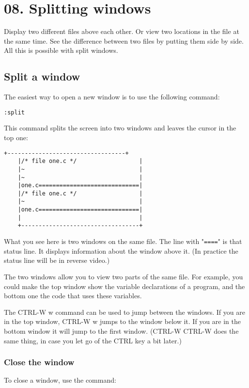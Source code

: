 \section{08. Splitting windows}
Display two different files above each other.
Or view two locations in the file at the same time.
See the difference between two files by putting them side by side.
All this is possible with split windows.
\subsection{Split a window}

The easiest way to open a new window is to use the following command:

 \begin{Verbatim}[samepage=true]
 :split
 \end{Verbatim}

This command splits the screen into two windows and leaves the cursor in the top one:

\begin{Verbatim}[samepage=true]
    +----------------------------------+
    |/* file one.c */                  |
    |~                                 |
    |~                                 |
    |one.c=============================|
    |/* file one.c */                  |
    |~                                 |
    |one.c=============================|
    |                                  |
    +----------------------------------+
\end{Verbatim}

What you see here is two windows on the same file.
The line with "\verb!====!" is that status line.
It displays information about the window above it.
(In practice the status line will be in reverse video.)

The two windows allow you to view two parts of the same file.
For example, you could make the top window show the variable declarations of a program, and the bottom one the code that uses these variables.

The CTRL-W w command can be used to jump between the windows.
If you are in the top window, CTRL-W w jumps to the window below it.
If you are in the bottom window it will jump to the first window.
(CTRL-W CTRL-W does the same thing, in case you let go of the CTRL key a bit later.)

\subsubsection{Close the window}
To close a window, use the command:

